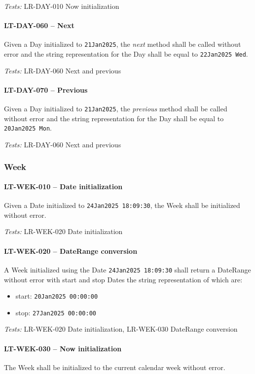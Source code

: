 \textit{Tests: } LR-DAY-010 Now initialization

\paragraph{LT-DAY-060 -- Next}
Given a Day initialized to \lstinline{21Jan2025}, the \emph{next} method
shall be called without error and the string representation for the Day
shall be equal to \lstinline{22Jan2025 Wed}.

\textit{Tests: } LR-DAY-060 Next and previous

\paragraph{LT-DAY-070 -- Previous}
Given a Day initialized to \lstinline{21Jan2025}, the \emph{previous} method
shall be called without error and the string representation for the Day
shall be equal to \lstinline{20Jan2025 Mon}.

\textit{Tests: } LR-DAY-060 Next and previous

\subsubsection{Week}
\paragraph{LT-WEK-010 -- Date initialization}
Given a Date initialized to \lstinline{24Jan2025 18:09:30}, the Week
shall be initialized without error.

\textit{Tests: } LR-WEK-020 Date initialization

\paragraph{LT-WEK-020 -- DateRange conversion}
A Week initialized using the Date \lstinline{24Jan2025 18:09:30} shall
return a DateRange without error with start and stop Dates the string
representation of which are:
\begin{itemize}
\item start: \lstinline{20Jan2025 00:00:00}
\item stop: \lstinline{27Jan2025 00:00:00}
\end{itemize}

\textit{Tests: } LR-WEK-020 Date initialization, LR-WEK-030 DateRange conversion

\paragraph{LT-WEK-030 -- Now initialization}
The Week shall be initialized to the current calendar week without error.

